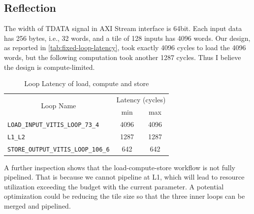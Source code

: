 \subsection{Reflection}


The width of TDATA signal in AXI Stream interface is 64bit.
Each input data has 256 bytes, i.e., 32 words, and a tile of 128 inputs has 4096 words.
Our design, as reported in \autoref{tab:fixed-loop-latency}, took exactly 4096 cycles to load the 4096 words, but the following computation took another 1287 cycles.
Thus I believe the design is compute-limited.


\begin{table}
    \centering
    \caption{Loop Latency of load, compute and store}
    \label{tab:fixed-loop-latency}
    \begin{tabular}{lcc}
        \toprule
        \multicolumn{1}{c}{\multirow{2}{*}{Loop Name}} & \multicolumn{2}{c}{Latency (cycles)}        \\
                                                       & min                                  & max  \\
        \midrule
        \verb+LOAD_INPUT_VITIS_LOOP_73_4+                         & 4096                                 & 4096 \\
        \verb+L1_L2+                         & 1287                                 & 1287 \\
        \verb+STORE_OUTPUT_VITIS_LOOP_106_6+                         & 642                                  & 642  \\
        \bottomrule
    \end{tabular}
\end{table}

A further inspection shows that the load-compute-store workflow is not fully pipelined.
That is because we cannot pipeline at L1, which will lead to resource utilization exceeding the budget with the current parameter.
A potential optimization could be reducing the tile size so that the three inner loops can be merged and pipelined.